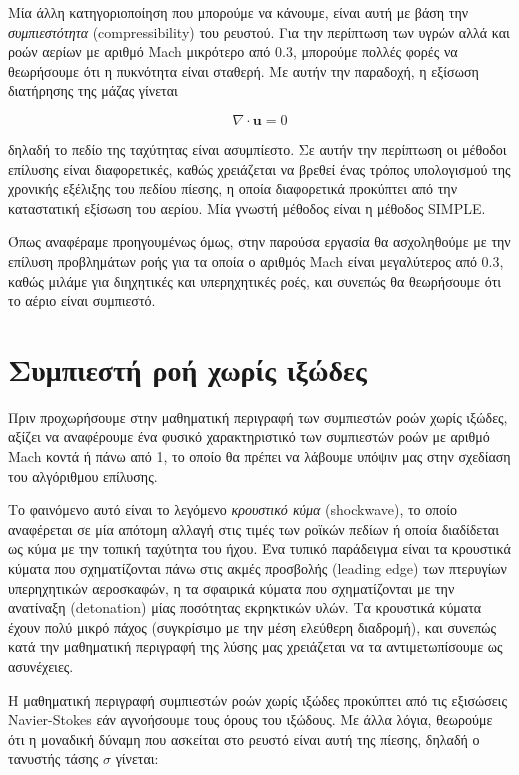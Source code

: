 Μία άλλη κατηγοριοποίηση που μπορούμε να κάνουμε, είναι αυτή με βάση την \emph{συμπιεστότητα} (compressibility) του ρευστού.
Για την περίπτωση των υγρών αλλά και ροών αερίων με αριθμό Mach μικρότερο από 0.3, μπορούμε πολλές φορές να θεωρήσουμε ότι η πυκνότητα είναι σταθερή.
Με αυτήν την παραδοχή, η εξίσωση διατήρησης της μάζας γίνεται

\begin{equation*}
    \nabla \cdot \mathbf{u} = 0
\end{equation*}

δηλαδή το πεδίο της ταχύτητας είναι ασυμπίεστο.
Σε αυτήν την περίπτωση οι μέθοδοι επίλυσης είναι διαφορετικές, καθώς χρειάζεται να βρεθεί ένας τρόπος υπολογισμού της χρονικής εξέλιξης του πεδίου πίεσης, η οποία διαφορετικά προκύπτει από την καταστατική εξίσωση του αερίου.
Μία γνωστή μέθοδος είναι η μέθοδος SIMPLE.

Όπως αναφέραμε προηγουμένως όμως, στην παρούσα εργασία θα ασχοληθούμε με την επίλυση προβλημάτων ροής για τα οποία ο αριθμός Mach είναι μεγαλύτερος από 0.3, καθώς μιλάμε για διηχητικές και υπερηχητικές ροές, και συνεπώς θα θεωρήσουμε ότι το αέριο είναι συμπιεστό.

\section{Συμπιεστή ροή χωρίς ιξώδες}

Πριν προχωρήσουμε στην μαθηματική περιγραφή των συμπιεστών ροών χωρίς ιξώδες, αξίζει να αναφέρουμε ένα φυσικό χαρακτηριστικό των συμπιεστών ροών με αριθμό Mach κοντά ή πάνω από 1, το οποίο θα πρέπει να λάβουμε υπόψιν μας στην σχεδίαση του αλγόριθμου επίλυσης.

Το φαινόμενο αυτό είναι το λεγόμενο \emph{κρουστικό κύμα} (shockwave), το οποίο αναφέρεται σε μία απότομη αλλαγή στις τιμές των ροϊκών πεδίων ή οποία διαδίδεται ως κύμα με την τοπική ταχύτητα του ήχου.
Ένα τυπικό παράδειγμα είναι τα κρουστικά κύματα που σχηματίζονται πάνω στις ακμές προσβολής (leading edge) των πτερυγίων υπερηχητικών αεροσκαφών, η τα σφαιρικά κύματα που σχηματίζονται με την ανατίναξη (detonation) μίας ποσότητας εκρηκτικών υλών.
Τα κρουστικά κύματα έχουν πολύ μικρό πάχος (συγκρίσιμο με την μέση ελεύθερη διαδρομή), και συνεπώς κατά την μαθηματική περιγραφή της λύσης μας χρειάζεται να τα αντιμετωπίσουμε ως ασυνέχειες.

Η μαθηματική περιγραφή συμπιεστών ροών χωρίς ιξώδες προκύπτει από τις εξισώσεις Navier-Stokes εάν αγνοήσουμε τους όρους του ιξώδους.
Με άλλα λόγια, θεωρούμε ότι η μοναδική δύναμη που ασκείται στο ρευστό είναι αυτή της πίεσης, δηλαδή ο τανυστής τάσης $\sigma$ γίνεται:

